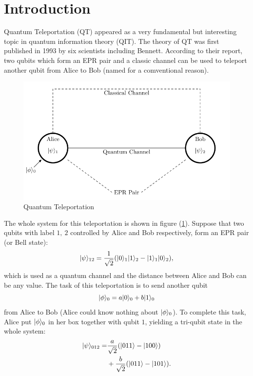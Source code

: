 \section*{Introduction}

	Quantum Teleportation (QT) appeared as a very fundamental but interesting topic in quantum information theory (QIT). The theory of QT was first published in 1993 by six scientists including Bennett\cite{art:93Bennett}. 
	According to their report, two qubits which form an EPR pair and a classic channel 
	can be used to teleport another qubit from Alice to Bob (named for a comventional reason).

	\begin{figure}[H]
	\centering
	\includegraphics[scale=0.65]{img/QT-1.pdf}
	\caption{Quantum Teleportation}
	\label{img:QT}
	\end{figure}
	The whole system for this teleportation is shown in figure (\ref{img:QT}). Suppose that two qubits with 
	label $1,\ 2$ controlled by Alice and Bob respectively, form an EPR pair (or Bell state):
	\begin{equation}
	|{\psi} \rangle_{12} = \frac{1}{\sqrt{2}} (|{0} \rangle_1 |{1} \rangle_2 - |{1} \rangle_1  |{0} \rangle_2),
	\end{equation}
	which is used as a quantum channel and the distance between Alice and Bob can be any value.
	The task of this teleportation is to send another qubit 
	\begin{equation}
	|{\phi} \rangle_0 = a|{0} \rangle_0+b|{1} \rangle_0
	\end{equation} 
	from Alice to Bob (Alice could know nothing about $|{\phi} \rangle_0$). To complete this task, 
	Alice put $|{\phi} \rangle_0$ in her box together with qubit $1$, yielding a tri-qubit state in the whole system:
	\begin{equation}
	\label{eq:triQubit} 
		\begin{split}
		|{\psi} \rangle_{012} = &\frac{a}{\sqrt{2}} ( |{011} \rangle - |{100} \rangle )\\
						& + \frac{b}{\sqrt{2}} (|{011} \rangle - |{101} \rangle).
		\end{split}
	\end{equation}
